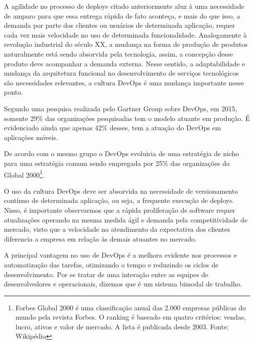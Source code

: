 A agilidade no processo de deploys citado anteriormente aluz à uma necessidade de amparo para que essa entrega rápida de fato aconteça, e mais do que isso, a demanda por parte dos clientes ou usuários de determinada aplicação, requer cada vez mais velocidade no uso de determinada funcionalidade. Analogamente à revolução industrial do século XX, a mudança na forma de produção de produtos naturalmente está sendo absorvida pela tecnologia, assim, a concepção desse produto deve acompanhar a demanda externa. Nesse sentido, a adaptabilidade e mudança da arquitetura funcional no desenvolvimento de serviços tecnológicos são necessidades relevantes, a cultura DevOps é uma mudança importante nesse ponto.

Segundo uma pesquisa realizada pelo Gartner Group sobre DevOps, em 2015, somente 29\% das organizações pesquisadas tem o modelo atuante em produção. É evidenciado ainda que apenas 42\% desses, tem a atuação do DevOps em aplicações móveis.

De acordo com o mesmo grupo o DevOps evoluiria de uma estratégia de nicho para uma estratégia comum sendo empregada por 25\% das organizações do Global 2000\footnote{Forbes Global 2000 é uma classificação anual das 2.000 empresas públicas do mundo pela revista Forbes. O ranking é baseado em quatro critérios: vendas, lucro, ativos e valor de mercado. A lista é publicada desde 2003. Fonte: Wikipédia}.

O uso da cultura DevOps deve ser absorvida na necessidade de versionamento contínuo de determinada aplicação, ou seja, a frequente execução de deploys. Nisso, é importante observarmos que a rápida proliferação de software requer atualizações operando na mesma medida ágil e demanda pela competitividade de mercado, visto que a velocidade no atendimento da expectativa dos clientes diferencia a empresa em relação às demais atuantes no mercado.



A principal vantagem no uso de DevOps é a melhora evidente nos processos e automatização das tarefas, otimizando o tempo e reduzindo os ciclos de desenvolvimento. Por se tratar de uma interação entre as equipes de desenvolvedores e operacionais, dizemos que é um sistema bimodal de trabalho.

